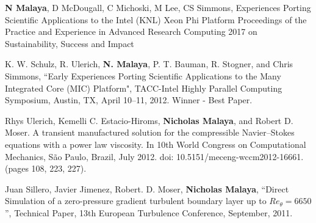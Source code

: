 \textbf{N Malaya}, D McDougall, C Michoski, M Lee, CS Simmons,
Experiences Porting Scientific Applications to the Intel (KNL) Xeon Phi Platform
Proceedings of the Practice and Experience in Advanced Research Computing
2017 on Sustainability, Success and Impact

\blankline

K. W. Schulz,  R. Ulerich,  \textbf{N. Malaya}, P. T. Bauman, R. Stogner, and Chris Simmons,
``Early Experiences Porting Scientific Applications to the Many Integrated Core (MIC) Platform",
TACC-Intel Highly Parallel Computing Symposium, Austin, TX,
April 10--11, 2012. Winner - Best Paper.

\blankline

Rhys Ulerich, Kemelli C. Estacio-Hiroms, \textbf{Nicholas Malaya}, and Robert D. Moser.
A transient manufactured solution for the compressible Navier–Stokes equations
with a power law viscosity. In 10th World Congress on Computational Mechanics,
São Paulo, Brazil, July 2012. doi: 10.5151/meceng-wccm2012-16661. (pages
108, 223, 227).

\blankline

Juan Sillero, Javier Jimenez, Robert. D. Moser, \textbf{Nicholas Malaya},
``Direct Simulation of a zero-pressure gradient turbulent boundary layer
up to $Re_{\theta}=6650$'', Technical Paper, 13th European Turbulence
Conference, September, 2011.
